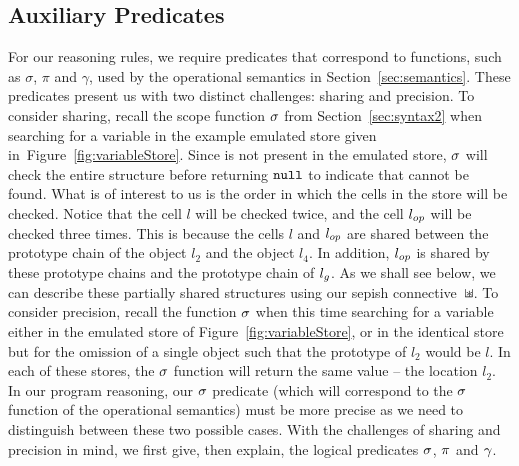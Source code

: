 \documentclass{article}
\begin{document}
\subsection{Auxiliary Predicates}
%
%
For our reasoning rules, we require predicates that correspond to 
functions, such as $\sigma$, $\pi$ and $\gamma$, used by the operational semantics in
Section~\ref{sec:semantics}. These predicates present  us with two distinct
challenges: sharing and precision. 
To consider  sharing, recall the scope function $\sigma$ from
Section~\ref{sec:syntax2} when searching for a variable  in the
example emulated store  given in~Figure~\ref{fig:variableStore}. Since  is
not present in the emulated store, $\sigma$ will check the entire
structure before returning $\mbox{\texttt{{\upshape null}}}$ to indicate that  cannot be
found. What is of interest to us is the order in which the cells in
the store will be checked. Notice that the cell $l$ will be checked
twice, and the cell $l_{op}$ will be checked three times. This is
because the cells $l$ and $l_{op}$ are shared between 
the prototype chain of the object $l_2$ and the object $l_4$. In
addition, $l_{op}$ is shared by these prototype chains and  the prototype chain of 
$l_g$. As we shall see below, we can describe these partially shared
structures using our sepish connective~$\mathbin{\sqcup\mkern-10mu*}$.
To consider precision, recall  the 
function $\sigma$  when this time  searching for a variable   either in the emulated store of 
Figure~\ref{fig:variableStore}, or in the identical store
but for the omission of a single object such that the prototype
of $l_2$ would be $l$. In each of these stores, the $\sigma$ function will
return the same value -- the location $l_2$. In our program reasoning,
 our $\sigma$ predicate (which will correspond to the $\sigma$
function of the operational semantics) must  be more precise as we need to 
distinguish between these two possible cases.
%
With the challenges of sharing and precision  in mind, we first give, then explain, the
logical predicates $\sigma$, $\pi$ and $\gamma$.
\end{document}
